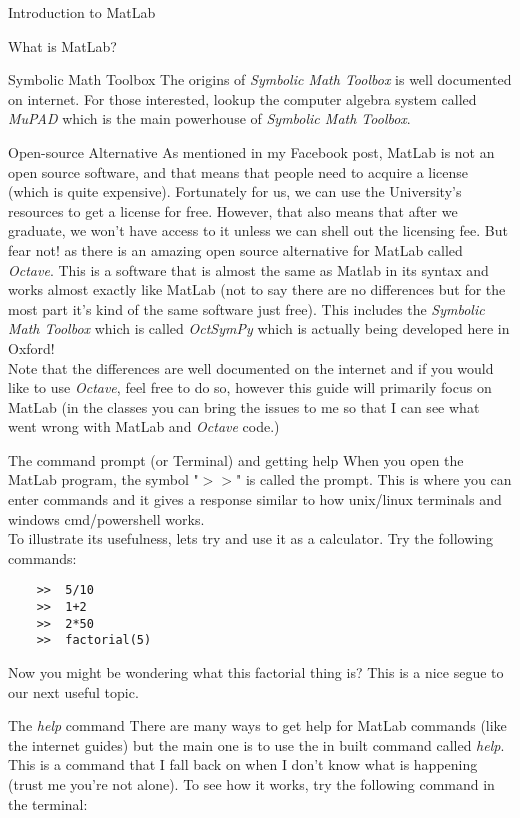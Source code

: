 \documentclass[11pt, oneside]{report}   	%
\begin{document}
\begin{chapter}{Introduction to MatLab}
\begin{section}{What is MatLab?}
\begin{subsection}{Symbolic Math Toolbox}
The origins of \textit{Symbolic Math Toolbox} is well documented on internet. For those interested, lookup the
computer algebra system called \textit{MuPAD} which is the main powerhouse of \textit{Symbolic Math Toolbox}.

\end{subsection}

\begin{subsection}{Open-source Alternative}
As mentioned in my Facebook post, MatLab is not an open source software, and that means that people need to
acquire a license (which is quite expensive). Fortunately for
us, we can use the University's resources to get a license for free. However, that also means that after we
graduate, we won't have access to it unless we can shell out the
licensing fee. But fear not! as there is an amazing open source alternative for MatLab called \textit{Octave}. This is
a software that is almost the same as Matlab in its syntax
and works almost exactly like MatLab (not to say there are no differences but for the most part it's kind of the same
software just free). This includes the \textit{Symbolic Math
Toolbox} which is called \textit{OctSymPy} which is actually being developed here in Oxford!
\\

Note that the differences are well documented on the internet and if you would like to use \textit{Octave}, feel free
to do so, however this guide will primarily focus on MatLab
(in the classes you can bring the issues to me so that I can see what went wrong with MatLab and \textit{Octave}
code.)
\end{subsection}

\end{section}

\begin{section}{The command prompt (or Terminal) and getting help}
When you open the MatLab program, the symbol "\(>\!\!>\)" is called the prompt. This is where you can enter
commands and it gives a response similar to how unix/linux terminals
and windows cmd/powershell works.\\

To illustrate its usefulness, lets try and use it as a calculator. Try the following commands:

\begin{lstlisting}
	>>	5/10
	>>	1+2
	>>	2*50
	>>	factorial(5)
\end{lstlisting}
Now you might be wondering what this factorial thing is? This is a nice segue to our next useful topic.
\begin{subsection}{The \textit{help} command}
There are many ways to get help for MatLab commands (like the internet guides) but the main one is to use the in
built command called \textit{help}. This is a command that I fall
back on when I don't know what is happening (trust me you're not alone). To see how it works, try the following
command in the terminal:


\end{subsection}
\end{section}
\end{chapter}
\end{document}
